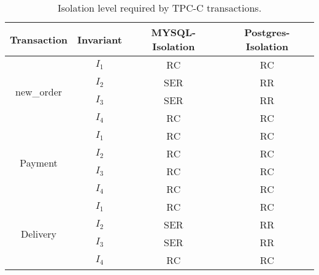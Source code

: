  	\begin{table*}[t]\small
	\centering
\begin{tabular}{|c|c|c|c|}
		\hline
	\textbf{Transaction}   & \textbf{Invariant} 
	& \textbf{MYSQL-Isolation} & \textbf{Postgres-Isolation} \\ 
	\hline
	\multirow{4}{*}{new\_order }  & $I_1$ 
	& RC &  RC\\ 
	&  $I_2$ &SER & RR \\
	&  $I_3$ & SER  &  RR  \\
	& $I_4$ & RC & RC   \\
	\hline
	\multirow{4}{*}{Payment}  & $I_1 $ 
	& RC &  RC\\ 
	&  $I_2$  &RC & RC \\
	&  $I_3 $ & RC  &  RC  \\
	& $I_4$  & RC & RC   \\
	\hline
	\multirow{4}{*}{Delivery}  & $I_1$  
	& RC &  RC \\ 
	&  $I_2$ &SER & RR \\
	&  $I_3$ & SER  &  RR \\
	& $I_4$  & RC & RC   \\
	\hline
\end{tabular}
	\caption{ Isolation level required by TPC-C transactions. }
	\label{tab:tpcc-eval}
\end{table*}
